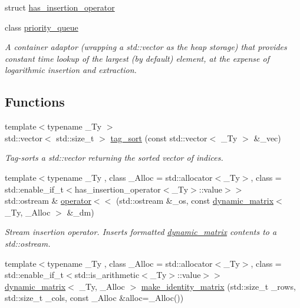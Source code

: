 \begin{DoxyCompactItemize}
struct \hyperlink{structcrsc_1_1has__insertion__operator}{has\+\_\+insertion\+\_\+operator}
\item 
class \hyperlink{classcrsc_1_1priority__queue}{priority\+\_\+queue}
\begin{DoxyCompactList}\small\item\em A container adaptor (wrapping a {\ttfamily std\+::vector} as the heap storage) that provides constant time lookup of the largest (by default) element, at the expense of logarithmic insertion and extraction. \end{DoxyCompactList}\end{DoxyCompactItemize}
\subsection*{Functions}
\begin{DoxyCompactItemize}
\item 
{\footnotesize template$<$typename \+\_\+\+Ty $>$ }\\std\+::vector$<$ std\+::size\+\_\+t $>$ \hyperlink{namespacecrsc_a51fa61162acf82f1c727d4add053bed8}{tag\+\_\+sort} (const std\+::vector$<$ \+\_\+\+Ty $>$ \&\+\_\+vec)
\begin{DoxyCompactList}\small\item\em Tag-\/sorts a {\ttfamily std\+::vector} returning the sorted vector of indices. \end{DoxyCompactList}\item 
{\footnotesize template$<$typename \+\_\+\+Ty , class \+\_\+\+Alloc  = std\+::allocator$<$\+\_\+\+Ty$>$, class  = std\+::enable\+\_\+if\+\_\+t$<$has\+\_\+insertion\+\_\+operator$<$\+\_\+\+Ty$>$\+::value$>$$>$ }\\std\+::ostream \& \hyperlink{namespacecrsc_a510824282aaf979436aba9e2df61a207}{operator$<$$<$} (std\+::ostream \&\+\_\+os, const \hyperlink{classcrsc_1_1dynamic__matrix}{dynamic\+\_\+matrix}$<$ \+\_\+\+Ty, \+\_\+\+Alloc $>$ \&\+\_\+dm)
\begin{DoxyCompactList}\small\item\em Stream insertion operator. Inserts formatted {\ttfamily \hyperlink{classcrsc_1_1dynamic__matrix}{dynamic\+\_\+matrix}} contents to a {\ttfamily std\+::ostream}. \end{DoxyCompactList}\item 
{\footnotesize template$<$typename \+\_\+\+Ty , class \+\_\+\+Alloc  = std\+::allocator$<$\+\_\+\+Ty$>$, class  = std\+::enable\+\_\+if\+\_\+t$<$std\+::is\+\_\+arithmetic$<$\+\_\+\+Ty$>$\+::value$>$$>$ }\\\hyperlink{classcrsc_1_1dynamic__matrix}{dynamic\+\_\+matrix}$<$ \+\_\+\+Ty, \+\_\+\+Alloc $>$ \hyperlink{namespacecrsc_aedc7c5cb9ecb0a6f0bb571a248342f85}{make\+\_\+identity\+\_\+matrix} (std\+::size\+\_\+t \+\_\+rows, std\+::size\+\_\+t \+\_\+cols, const \+\_\+\+Alloc \&alloc=\+\_\+\+Alloc())

\end{DoxyCompactItemize}
